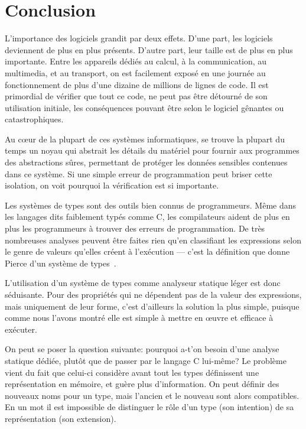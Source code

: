 
\section{Conclusion}

L'importance des logiciels grandit par deux effets.
D'une part, les logiciels deviennent de plus en plus présents.
D'autre part, leur taille est de plus en plus importante.
Entre les appareils dédiés au calcul, à la communication, au multimedia, et au
transport, on est facilement exposé en une journée au fonctionnement de plus
d'une dizaine de millions de lignes de code.
Il est primordial de vérifier que tout ce code, ne peut pas être détourné de son
utilisation initiale, les conséquences pouvant être selon le logiciel gênantes
ou catastrophiques.

Au cœur de la plupart de ces systèmes informatiques, se trouve la plupart du
temps un noyau qui abstrait les détails du matériel pour fournir aux programmes
des abstractions sûres, permettant de protéger les données sensibles contenues
dans ce système. Si une simple erreur de programmation peut briser cette
isolation, on voit pourquoi la vérification est si importante.

\jolibreak

Les systèmes de types sont des outils bien connus de programmeurs. Même dans les
langages dits faiblement typés comme C, les compilateurs aident de plus en plus
les programmeurs à trouver des erreurs de programmation. De très nombreuses
analyses peuvent être faites rien qu'en classifiant les expressions selon le
genre de valeurs qu'elles créent à l'exécution --- c'est la définition que donne
Pierce d'un système de types~\cite[p.~1]{TAPL}.

L'utilisation d'un système de types comme analyseur statique léger est donc
séduisante. Pour des propriétés qui ne dépendent pas de la valeur des
expressions, mais uniquement de leur forme, c'est d'ailleurs la solution la plus
simple, puisque comme nous l'avons montré elle est simple à mettre en œuvre et
efficace à exécuter.

On peut se poser la question suivante: pourquoi a-t'on besoin d'une analyse
statique dédiée, plutôt que de passer par le langage C lui-même? Le problème
vient du fait que celui-ci considère avant tout les types définissent une
représentation en mémoire, et guère plus d'information. On peut définir des
nouveaux noms pour un type, mais l'ancien et le nouveau sont alors compatibles.
En un mot il est impossible de distinguer le rôle d'un type (son intention) de
sa représentation (son extension).

